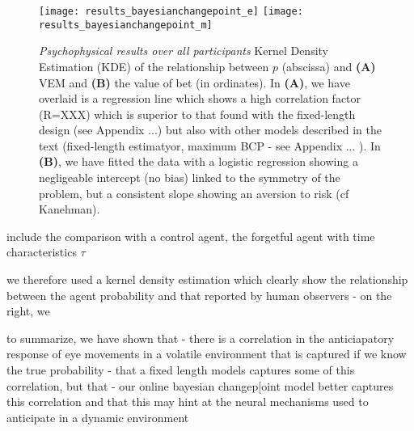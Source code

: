 \documentclass[profile,final,english, draft]{article}%
\begin{document}
\begin{figure}%
\begin{center}
    \texttt{[image: results\_bayesianchangepoint\_e]}
    \texttt{[image: results\_bayesianchangepoint\_m]}
\end{center}
\caption{\emph{Psychophysical results over all participants}
Kernel Density Estimation (KDE) of the relationship between $p$ (abscissa) and \textbf{(A)} VEM and \textbf{(B)} the value of bet (in ordinates). In \textbf{(A)}, we have overlaid is a regression line which shows a high correlation factor (R=XXX) which is superior to that found with the fixed-length design (see Appendix ...) but also with other models described in the text (fixed-length estimatyor, maximum BCP - see Appendix ... ). In \textbf{(B)}, we have fitted the data with a logistic regression showing a negligeable intercept (no bias) linked to the symmetry of the problem, but a consistent slope showing an aversion to risk (cf Kanehman).
}
\label{fig:results_psycho}
\end{figure}

include the comparison with a control agent, the forgetful agent with time characteristics $\tau$


we therefore used a kernel density estimation which clearly show the relationship between the agent probability and that reported by human observers
- on the right, we

to summarize, we have shown that
- there is a correlation in the anticiapatory response of eye movements in a volatile environment that is captured if we know the true probability
- that a fixed length models captures some of this correlation, but that
- our online bayesian changep[oint model better captures this correlation and that this may hint at the neural mechanisms used to anticipate in a dynamic environment
\end{document}
